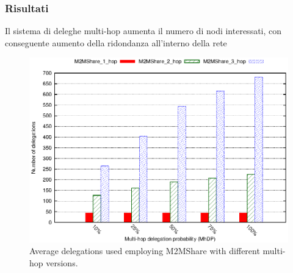 \documentclass{beamer}
\begin{document}
\begin{frame}
\begin{figure}[htbp]
\vspace{-10pt}%
\pause
{}
\end{figure}
\end{frame}

\begin{frame}
\frametitle{Risultati}
Il sistema di deleghe multi-hop aumenta il numero di nodi interessati, con conseguente aumento della ridondanza all'interno della rete
\begin{center}
\begin{figure}[ht]
\pause
\includegraphics[scale=0.55]{delegheMultiHopPerc.eps}
\caption{Average delegations used employing M2MShare with different multi-hop versions.}
\end{figure}
\end{center}
\end{frame}
\end{document}

